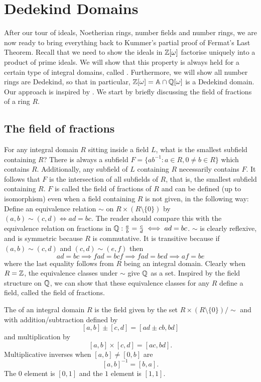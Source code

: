 \chapter{Dedekind Domains}\label{sec-dedekind}
After our tour of ideals, Noetherian rings, number fields and number rings, we are now ready to bring everything back to Kummer's partial proof of Fermat's Last Theorem. Recall that we need to show the ideals in $\mathbb{Z}[\omega]$ factorise uniquely into a product of prime ideals. We will show that this property is always held for a certain type of integral domains, called . Furthermore, we will show all number rings are Dedekind, so that in particular, $\mathbb{Z}[\omega]=\mathbb{A}\cap\mathbb{Q}[\omega]$ is a Dedekind domain. Our approach is inspired by \cite{Wright}. We start by briefly discussing the field of fractions of a ring $R.$

\section{The field of fractions}
For any integral domain $R$ sitting inside a field $L$, what is the smallest subfield containing $R$? There is always a subfield $F=\{ab^{-1}:a\in R, 0\neq b\in R\}$ which contains $R$. Additionally, any subfield of $L$ containing $R$ necessarily contains $F$. It follows that $F$ is the intersection of all subfields of $R$, that is, the smallest subfield containing $R$. $F$ is called the field of fractions of $R$ and can be defined (up to isomorphism) even when a field containing $R$ is not given, in the following way: Define an equivalence relation $\sim$ on $R\times (R\setminus\{0\})$ by $(a,b)\sim (c,d)\iff ad=bc$. The reader should compare this with the equivalence relation on fractions in $\mathbb{Q}:\frac{a}{b}=\frac{c}{d}\iff ad=bc$. $\sim$ is clearly reflexive, and is symmetric because $R$ is commutative. It is transitive because if $(a,b)\sim (c,d)$ and $(c,d)\sim (e,f)$
then $$ad=bc\implies fad=bcf\implies fad=bed\implies af=be$$
where the last equality follows from $R$ being an integral domain. Clearly when $R=\mathbb{Z}$, the equivalence classes under $\sim$ give $\mathbb{Q}$ as a set. Inspired by the field structure on $\mathbb{Q}$, we can show that these equivalence classes for any $R$ define a field, called the field of fractions.

\begin{definition}\label{field-of-fractions}
The  of an integral domain $R$ is the field given by the set $R\times (R\setminus\{0\})/\sim$ and with addition/subtraction defined by $$[a,b]\pm[c,d]=[ad\pm cb,bd]$$
and multiplication by
$$[a,b]\times [c,d]=[ac,bd].$$
Multiplicative inverses when $[a,b]\neq [0,b]$ are
$$[a,b]^{-1}=[b,a].$$
The $0$ element is $[0,1]$ and the $1$ element is $[1,1]$.\end{definition}

